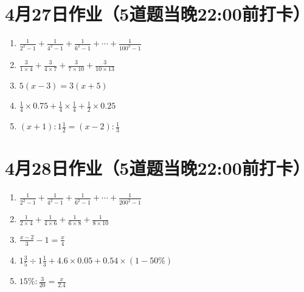 \documentclass[UTF8,12pt,a4paper]{ctexart}
\newcommand{\BottomWriteSpace}{1.8cm}
\newenvironment{OnePageFiveFill}{
  \small
  \vspace*{0pt}
  \begin{enumerate}[leftmargin=*, itemsep=0pt, topsep=0pt, parsep=0pt, partopsep=0pt]
  \setlength{\parskip}{0pt}
}{
  \end{enumerate}
  \vspace*{\BottomWriteSpace}
  \normalsize
  \newpage
}
\newcommand{\Q}[1]{\item #1\par\vfill}
\newcommand{\Qlast}[1]{\item #1\par}
\begin{document}
\section*{4月27日作业（5道题当晚22:00前打卡）}
\begin{OnePageFiveFill}

\Q{$\displaystyle \frac{1}{2^2 - 1} + \frac{1}{4^2 - 1} + \frac{1}{6^2 - 1} + \cdots + \frac{1}{100^2 - 1}$}

\Q{$\displaystyle \frac{3}{1 \times 4} + \frac{3}{4 \times 7} + \frac{3}{7 \times 10} + \frac{3}{10 \times 13}$}

\Q{$5(x - 3) = 3(x + 5)$}

\Q{$\displaystyle \frac{1}{4} \times 0.75 + \frac{1}{4} \times \frac{1}{4} + \frac{1}{2} \times 0.25$}

\Qlast{$\displaystyle (x + 1) : 1 \frac{1}{2} = (x - 2) : \frac{1}{3}$}

\end{OnePageFiveFill}

\section*{4月28日作业（5道题当晚22:00前打卡）}
\begin{OnePageFiveFill}

\Q{$\displaystyle \frac{1}{2^2 - 1} + \frac{1}{4^2 - 1} + \frac{1}{6^2 - 1} + \cdots + \frac{1}{200^2 - 1}$}

\Q{$\displaystyle \frac{1}{2 \times 4} + \frac{1}{4 \times 6} + \frac{1}{6 \times 8} + \frac{1}{8 \times 10}$}

\Q{$\displaystyle \frac{x-2}{3} - 1 = \frac{x}{4}$}

\Q{$\displaystyle 1 \frac{3}{5} \div 1 \frac{1}{3} + 4.6 \times 0.05 + 0.54 \times (1 - 50\%)$}

\Qlast{$\displaystyle 15\% : \frac{3}{20} = \frac{x}{2.4}$}

\end{OnePageFiveFill}

\end{document}
